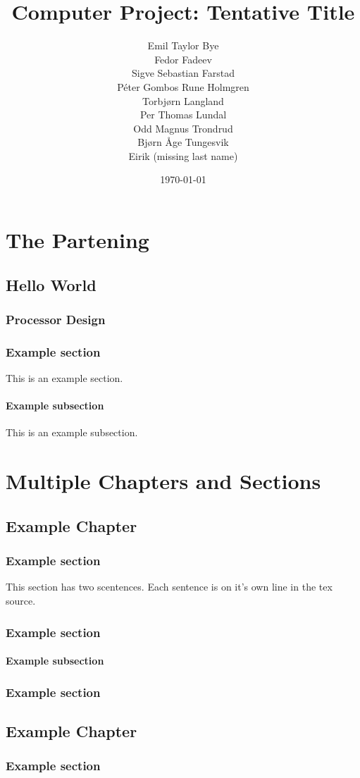 \documentclass{report}
\title{Computer Project: Tentative Title}
\date{\today}
\author{Emil Taylor Bye
     \\ Fedor Fadeev
     \\ Sigve Sebastian Farstad
     \\ Péter Gombos Rune Holmgren
     \\ Torbjørn Langland
     \\ Per Thomas Lundal
     \\ Odd Magnus Trondrud
     \\ Bjørn Åge Tungesvik
     \\ Eirik (missing last name)
}
\begin{document}
\maketitle

\begin{abstract}
	
\end{abstract}

\tableofcontents

\part{The Partening}

\chapter{Hello World}

\section{Processor Design}
	
	
\section{Example section}

This is an example section.

\subsection{Example subsection}

This is an example subsection.

\part{Multiple Chapters and Sections}

\chapter{Example Chapter}
	
\section{Example section}

This section has two scentences.
Each sentence is on it's own line in the tex source.

\section{Example section}

\subsection{Example subsection}

\section{Example section}

\chapter{Example Chapter}

\section{Example section}
\end{document}

